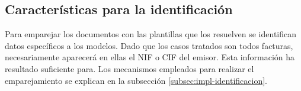 \subsection{Características para la identificación}

Para emparejar los documentos con las plantillas que los resuelven se identifican datos específicos a los modelos. Dado que los casos tratados son todos facturas, necesariamente aparecerá en ellas el NIF o CIF del emisor. Esta información ha resultado suficiente para. Los mecanismos empleados para realizar el emparejamiento se explican en la subsección \ref{subsec:impl-identificacion}.

